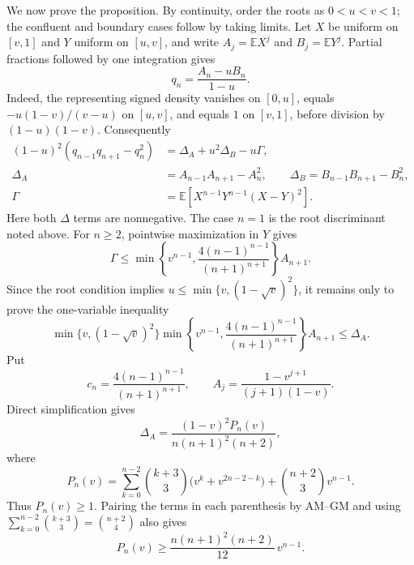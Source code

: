 \documentclass[11pt]{article}
\theoremstyle{remark}
\begin{document}
We now prove the proposition.  By continuity, order the roots as
$0<u<v<1$; the confluent and boundary cases follow by taking limits.  Let
$X$ be uniform on $[v,1]$
and $Y$ uniform on $[u,v]$, and write $A_j=\mathbb E X^j$ and
$B_j=\mathbb E Y^j$.  Partial fractions followed by one integration gives
\begin{equation}\label{eq:real-first-uniform-difference}
 q_n=\frac{A_n-uB_n}{1-u}.
\end{equation}
Indeed, the representing signed density vanishes on $[0,u]$, equals
$-u(1-v)/(v-u)$ on $[u,v]$, and equals $1$ on $[v,1]$, before division by
$(1-u)(1-v)$.  Consequently
\begin{align}
 (1-u)^2(q_{n-1}q_{n+1}-q_n^2)
  &=\Delta_A+u^2\Delta_B-u\Gamma,\label{eq:real-first-uniform-determinant}\\
 \Delta_A&=A_{n-1}A_{n+1}-A_n^2,\qquad
 \Delta_B=B_{n-1}B_{n+1}-B_n^2,\nonumber\\
 \Gamma&=\mathbb E\!\left[X^{n-1}Y^{n-1}(X-Y)^2\right].\nonumber
\end{align}
Here both $\Delta$ terms are nonnegative.  The case $n=1$ is the root
discriminant noted above.  For $n\geq2$, pointwise
maximization in $Y$ gives
\begin{equation}\label{eq:real-first-cross-bound}
 \Gamma\leq
 \min\!\left\{v^{n-1},
 \frac{4(n-1)^{n-1}}{(n+1)^{n+1}}\right\}A_{n+1}.
\end{equation}
Since the root condition implies
$u\leq\min\{v,(1-\sqrt v)^2\}$, it remains only to prove the
one-variable inequality
\begin{equation}\label{eq:real-first-one-variable-moment-bound}
 \min\{v,(1-\sqrt v)^2\}
 \min\!\left\{v^{n-1},
 \frac{4(n-1)^{n-1}}{(n+1)^{n+1}}\right\}A_{n+1}
 \leq\Delta_A .
\end{equation}
Put
\[
 c_n=\frac{4(n-1)^{n-1}}{(n+1)^{n+1}},
 \qquad
 A_j=\frac{1-v^{j+1}}{(j+1)(1-v)}.
\]
Direct simplification gives
\begin{equation}\label{eq:uniform-moment-determinant-polynomial}
 \Delta_A
 =\frac{(1-v)^2P_n(v)}{n(n+1)^2(n+2)},
\end{equation}
where
\begin{equation}\label{eq:uniform-moment-palindromic-polynomial}
 P_n(v)=
 \sum_{k=0}^{n-2}\binom{k+3}{3}
       \bigl(v^k+v^{2n-2-k}\bigr)
 +\binom{n+2}{3}v^{n-1}.
\end{equation}
Thus $P_n(v)\geq1$.  Pairing the terms in each parenthesis by AM--GM and
using $\sum_{k=0}^{n-2}\binom{k+3}{3}=\binom{n+2}{4}$ also gives
\begin{equation}\label{eq:uniform-moment-central-lower-bound}
 P_n(v)\geq\frac{n(n+1)^2(n+2)}{12}\,v^{n-1}.
\end{equation}
\end{document}

